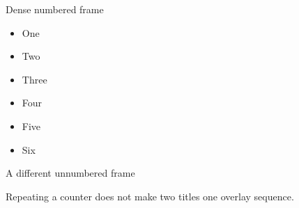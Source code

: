 \documentclass[11pt,aspectratio=169]{beamer}
\begin{document}
\begin{frame}{Dense numbered frame}
  \begin{itemize}
    \item One
    \item Two
    \item Three
    \item Four
    \item Five
    \item Six
  \end{itemize}
\end{frame}
\begin{frame}[noframenumbering]{A different unnumbered frame}
  \begin{ResultBox}
    Repeating a counter does not make two titles one overlay sequence.
  \end{ResultBox}
\end{frame}
\end{document}
